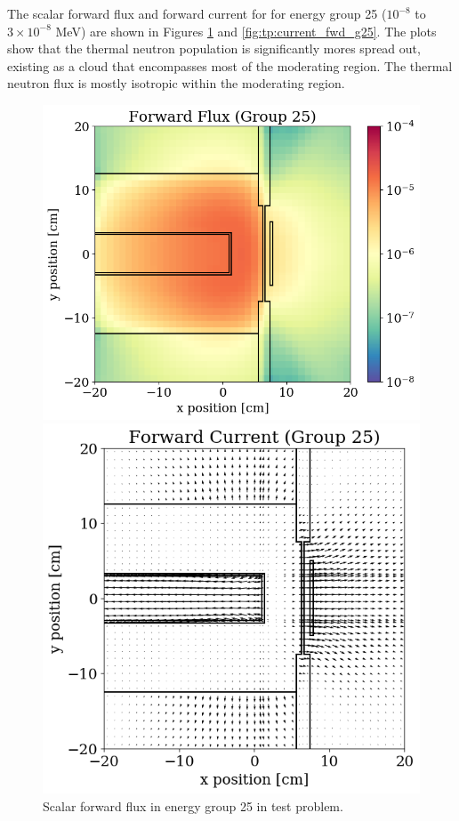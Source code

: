 The scalar forward flux and forward current for for energy group 25 ($10^{-8}$ to $3\times 10^{-8}$ MeV) are shown in Figures \ref{fig:tp:scalar_flux_fwd_g25} and \ref{fig:tp:current_fwd_g25}.
The plots show that the thermal neutron population is significantly mores spread out, existing as a cloud that encompasses most of the moderating region.
The thermal neutron flux is mostly isotropic within the moderating region.

\begin{figure}
  \begin{minipage}{0.54\linewidth}
    \centering
    \includegraphics[width=\linewidth]{content/testprob/scalar_flux_fwd_g25.png}
    \caption{Scalar forward flux in energy group 25 in test problem.}
    \label{fig:tp:scalar_flux_fwd_g25}
  \end{minipage}
  \hfill
  \begin{minipage}{0.45\linewidth}
    \centering
    \includegraphics[width=\linewidth]{content/testprob/current_fwd_g25.png}

\end{minipage}
\end{figure}
